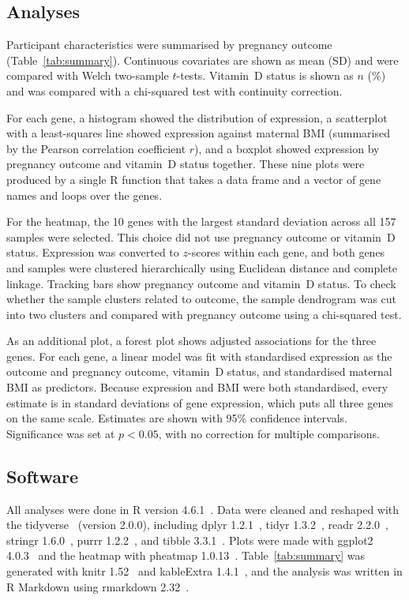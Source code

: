 \documentclass[11pt]{article}
\begin{document}
\subsection{Analyses}
Participant characteristics were summarised by pregnancy outcome (Table~\ref{tab:summary}).
Continuous covariates are shown as mean (SD) and were compared with Welch
two-sample $t$-tests. Vitamin~D status is shown as $n$ (\%) and was compared
with a chi-squared test with continuity correction.

For each gene, a histogram showed the distribution of expression, a
scatterplot with a least-squares line showed expression against maternal BMI
(summarised by the Pearson correlation coefficient $r$), and a boxplot showed
expression by pregnancy outcome and vitamin~D status together. These nine
plots were produced by a single R function that takes a data frame and a vector
of gene names and loops over the genes.

For the heatmap, the 10 genes with the largest standard deviation across all
157 samples were selected. This choice did not use pregnancy outcome or vitamin~D
status. Expression was converted to $z$-scores within each gene, and both genes
and samples were clustered hierarchically using Euclidean distance and complete
linkage. Tracking bars show pregnancy outcome and vitamin~D status. To check
whether the sample clusters related to outcome, the sample dendrogram was cut
into two clusters and compared with pregnancy outcome using a chi-squared test.

As an additional plot, a forest plot shows adjusted associations for the three
genes. For each gene, a linear model was fit with standardised expression as
the outcome and pregnancy outcome, vitamin~D status, and standardised maternal
BMI as predictors. Because expression and BMI were both standardised, every
estimate is in standard deviations of gene expression, which puts all three
genes on the same scale. Estimates are shown with 95\% confidence intervals.
Significance was set at $p<0.05$, with no correction for multiple comparisons.

\subsection{Software}
All analyses were done in R version 4.6.1~\cite{R-base}. Data were cleaned and
reshaped with the tidyverse~\cite{tidyverse2019} (version 2.0.0), including
dplyr 1.2.1~\cite{R-dplyr}, tidyr 1.3.2~\cite{R-tidyr}, readr
2.2.0~\cite{R-readr}, stringr 1.6.0~\cite{R-stringr}, purrr
1.2.2~\cite{R-purrr}, and tibble 3.3.1~\cite{R-tibble}. Plots were made with
ggplot2 4.0.3~\cite{ggplot2book, R-ggplot2} and the heatmap with pheatmap
1.0.13~\cite{R-pheatmap}. Table~\ref{tab:summary} was generated with knitr
1.52~\cite{R-knitr} and kableExtra 1.4.1~\cite{R-kableExtra}, and the analysis
was written in R Markdown using rmarkdown 2.32~\cite{R-rmarkdown}.
\end{document}
